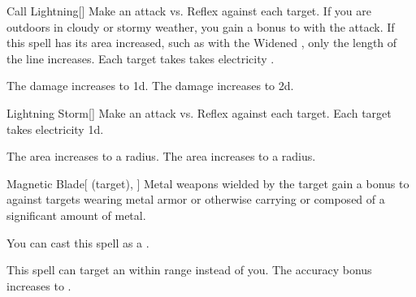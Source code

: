 \lowercase{\hypertarget{spell:Call Lightning}{}}\label{spell:Call Lightning}
\begin{freeability}[Rank 3]{\hypertarget{spell:Call Lightning}{Call Lightning}}[]
Make an attack vs. Reflex against each target.
If you are outdoors in cloudy or stormy weather, you gain a  bonus to  with the attack.
If this spell has its area increased, such as with the Widened , only the length of the line increases.
\hit Each target takes takes electricity .


\rankline
{} The damage increases to  \plus1d.
 The damage increases to  \plus2d.

\end{freeability}
\vspace{0.25em}



\lowercase{\hypertarget{spell:Lightning Storm}{}}\label{spell:Lightning Storm}
\begin{freeability}[Rank 3]{\hypertarget{spell:Lightning Storm}{Lightning Storm}}[]
Make an attack vs. Reflex against each target.
\hit Each target takes electricity  \minus1d.

\rankline
{} The area increases to a \arealarge radius.
 The area increases to a \areahuge radius.

\end{freeability}
\vspace{0.25em}



\lowercase{\hypertarget{spell:Magnetic Blade}{}}\label{spell:Magnetic Blade}
\begin{attuneability}[Rank 3]{\hypertarget{spell:Magnetic Blade}{Magnetic Blade}}[ (target), ]
Metal weapons wielded by the target gain a  bonus to  against targets wearing metal armor or otherwise carrying or composed of a significant amount of metal.

You can cast this spell as a .

\rankline
{} This spell can target an  within \rngmed range instead of you.
 The accuracy bonus increases to .

\end{attuneability}
\vspace{0.25em}



